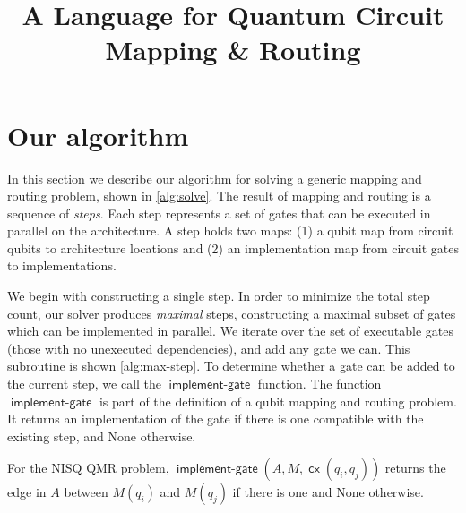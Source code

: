 \documentclass[anonymous, nonacm, acmsmall,screen,review]{acmart}
\title{A Language for Quantum Circuit Mapping \& Routing}
\newcommand{\arch}{A}
\newcommand{\map}{M}
\DeclareMathOperator*{\addgate}{\textsf{implement-gate}}
\DeclareMathOperator*{\cx}{\textsf{cx}}
\begin{document}
\maketitle
\section{Our algorithm}
\label{}

In this section we describe our algorithm for solving a generic mapping and routing problem, shown in \cref{alg:solve}. %
The result of mapping and routing is a sequence of \emph{steps}. %
Each step represents a set of gates that can be executed in parallel on the architecture. %
A step holds two maps: (1) a qubit map from circuit qubits to architecture locations and (2) an implementation
map from circuit gates to implementations.  

We begin with constructing a single step. %
In order to minimize the total step count, our  solver produces \emph{maximal} steps, constructing a maximal
subset of gates which can be implemented in parallel. We iterate over the set of executable gates (those with no unexecuted dependencies), and add any gate  we can. This subroutine is shown \cref{alg:max-step}. %
To determine whether a gate can be added to the current step, we call the $\addgate$ function.
The function $\addgate$ is part of the definition of a qubit mapping and routing problem. %
It returns an implementation of the gate if there is one compatible with the existing step, and \textsf{None}
otherwise. 

\begin{example}
    For the NISQ QMR problem, $\addgate(\arch, \map, \cx(q_i,q_j))$ returns the edge in $\arch$ between $\map(q_i)$
    and $\map(q_j)$ if there is one and \textsf{None} otherwise.
\end{example}
\end{document}
